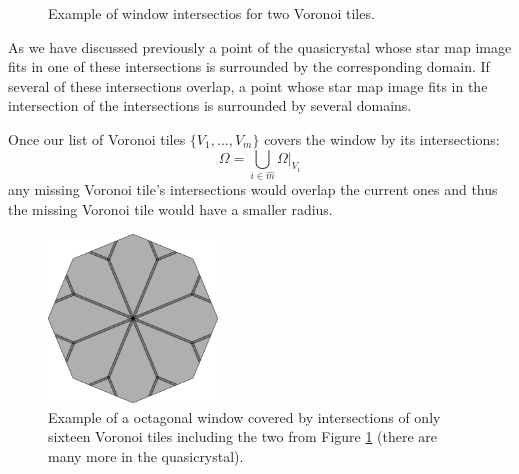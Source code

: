 \documentclass[text.tex]{subfiles}
\begin{document}
\begin{figure}[h!]
\begin{minipage}{0.4\textwidth}
\end{minipage}
\caption{Example of window intersectios for two Voronoi tiles. }
\label{fig_quasicrystalExampleIntersection}
\end{figure}

As we have discussed previously a point of the quasicrystal whose star map image fits in one of these intersections is surrounded by the corresponding domain. If several of these intersections overlap, a point whose star map image fits in the intersection of the intersections is surrounded by several domains. 

Once our list of Voronoi tiles $\{V_1,\dots,V_m\}$ covers the window by its intersections: 
$$\Omega = \bigcup\limits_{i\in\hat{m}}\Omega|_{V_i}$$
any missing Voronoi tile's intersections would overlap the current ones and thus the missing Voronoi tile would have a smaller radius. 

\begin{figure}[h!]
\centering
\includegraphics[width=0.4\textwidth]{img/2D/cover}
\caption{Example of a octagonal window covered by intersections of only sixteen Voronoi tiles including the two from Figure \ref{fig_quasicrystalExampleIntersection} (there are many more in the quasicrystal). }
\label{fig_quasicrystalExampleOctagonWindow}
\end{figure}
\end{document}
